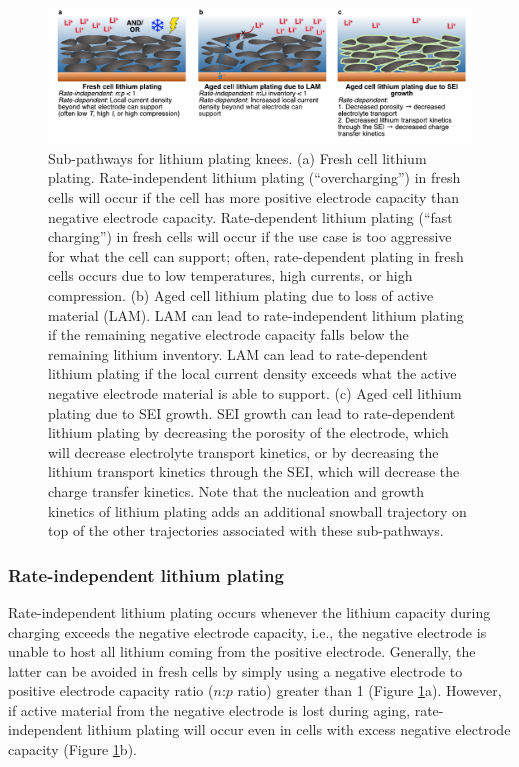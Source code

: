 \documentclass[journal=jpclcd,manuscript=article]{achemso}
\begin{document}
\begin{figure}[tbph]
    \centering
    \includegraphics[scale=0.9]{final_figures/plating_pathways.pdf}
    \caption{Sub-pathways for lithium plating knees.
    (a) Fresh cell lithium plating. Rate-independent lithium plating (``overcharging'') in fresh cells will occur if the cell has more positive electrode capacity than negative electrode capacity.
    Rate-dependent lithium plating (``fast charging'') in fresh cells will occur if the use case is too aggressive for what the cell can support; often, rate-dependent plating in fresh cells occurs due to low temperatures, high currents, or high compression.
    (b) Aged cell lithium plating due to loss of active material (LAM). LAM can lead to rate-independent lithium plating if the remaining negative electrode capacity falls below the remaining lithium inventory. LAM can lead to rate-dependent lithium plating if the local current density exceeds what the active negative electrode material is able to support.
    (c) Aged cell lithium plating due to SEI growth. SEI growth can lead to rate-dependent lithium plating by decreasing the porosity of the electrode, which will decrease electrolyte transport kinetics, or by decreasing the lithium transport kinetics through the SEI, which will decrease the charge transfer kinetics.
    Note that the nucleation and growth kinetics of lithium plating adds an additional snowball trajectory on top of the other trajectories associated with these sub-pathways.}
    \label{fig:plating_pathways}
\end{figure}

\subsubsection{Rate-independent lithium plating}


Rate-independent lithium plating occurs whenever the lithium capacity during charging exceeds the negative electrode capacity, i.e., the negative electrode is unable to host all lithium coming from the positive electrode. Generally, the latter can be avoided in fresh cells by simply using a negative electrode to positive electrode capacity ratio ($n$:$p$ ratio) greater than 1 (Figure \ref{fig:plating_pathways}a). However, if active material from the negative electrode is lost during aging, rate-independent lithium plating will occur even in cells with excess negative electrode capacity (Figure \ref{fig:plating_pathways}b).
\end{document}
